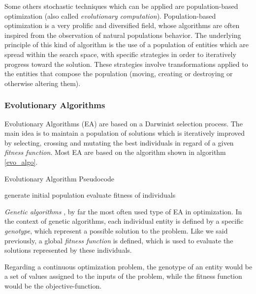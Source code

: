Some others stochastic techniques which can be applied are population-based optimization (also called \emph{evolutionary computation}). Population-based optimization is a very prolific and diversified field, whose algorithms are often inspired from the observation of natural populations behavior. The underlying principle of this kind of algorithm is the use of a population of entities which are spread within the search space, with specific strategies in order to iteratively progress toward the solution. These strategies involve transformations applied to the entities that compose the population (moving, creating or destroying or otherwise altering them).

\subsubsection{Evolutionary Algorithms}

Evolutionary Algorithms (EA) are based on a Darwinist selection process. The main idea is to maintain a population of solutions which is iteratively improved by selecting, crossing and mutating the best individuals in regard of a given \emph{fitness function}. Most EA are based on the algorithm shown in algorithm \ref{evo_algo}.

\begin{algorithm}
\caption{Evolutionary Algorithm Pseudocode}
\label{evo_algo}

	generate initial population\;
	evaluate fitness of individuals\;
\end{algorithm}

\emph{Genetic algorithms} \cite{holland1992adaptation}, by far the most often used type of EA in optimization. In the context of genetic algorithms, each individual entity is defined by a specific \emph{genotype}, which represent a possible solution to the problem.
Like we said previously, a global \emph{fitness function} is defined, which is used to evaluate the solutions represented by these individuals.

Regarding a continuous optimization problem, the genotype of an entity would be a set of values assigned to the inputs of the problem, while the fitness function would be the objective-function.

